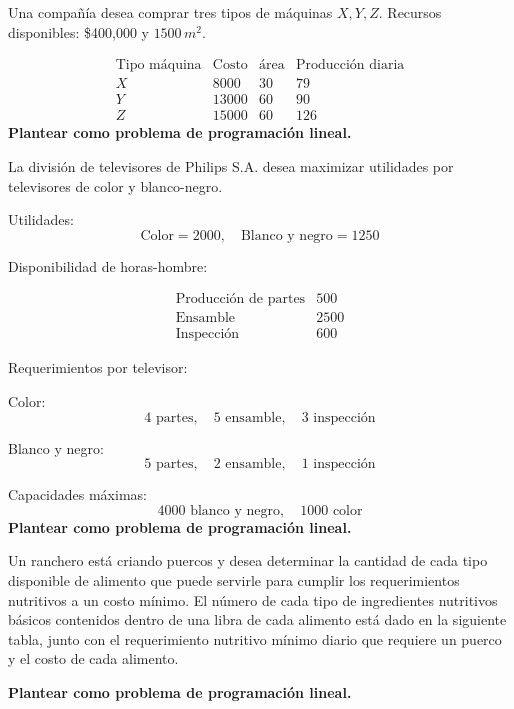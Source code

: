 \begin{Ejer}
 Una compa\~n\'ia desea comprar tres tipos de m\'aquinas $X,Y,Z$.   Recursos disponibles: \$400,000 y $1500\,m^2$.

\[
\begin{array}{c|ccc}
\text{Tipo m\'aquina} & \text{Costo} & \text{\'area} & \text{Producci\'on diaria} \\
\hline
X & 8000 & 30 & 79 \\
Y & 13000 & 60 & 90 \\
Z & 15000 & 60 & 126
\end{array}
\]
\textbf{Plantear como problema de programaci\'on lineal.}
\end{Ejer}

\begin{Ejer} La divisi\'on de televisores de Philips S.A. desea maximizar utilidades por televisores de color y blanco-negro.

Utilidades:
\[
\text{Color} = 2000, \quad \text{Blanco y negro} = 1250
\]

Disponibilidad de horas-hombre:

\[
\begin{array}{c|c}
\text{Producci\'on de partes} & 500 \\
\text{Ensamble} & 2500 \\
\text{Inspecci\'on} & 600
\end{array}
\]

Requerimientos por televisor:

Color:
\[
4 \text{ partes},\quad 5 \text{ ensamble},\quad 3 \text{ inspecci\'on}
\]

Blanco y negro:
\[
5 \text{ partes},\quad 2 \text{ ensamble},\quad 1 \text{ inspecci\'on}
\]

Capacidades m\'aximas:
\[
4000 \text{ blanco y negro}, \quad 1000 \text{ color}
\]
\textbf{Plantear como problema de programaci\'on lineal.}
\end{Ejer}

\begin{Ejer}
Un ranchero est\'a criando puercos y desea determinar la cantidad de cada tipo disponible de alimento que puede servirle para cumplir los requerimientos nutritivos a un costo m\'inimo. El n\'umero de cada tipo de ingredientes nutritivos b\'asicos contenidos dentro de una libra de cada alimento est\'a dado en la siguiente tabla, junto con el requerimiento nutritivo m\'inimo diario que requiere un puerco y el costo de cada alimento.
\begin{table}[h]
\centering
{}
\end{table}
\textbf{Plantear como problema de programaci\'on lineal.}
\end{Ejer}

